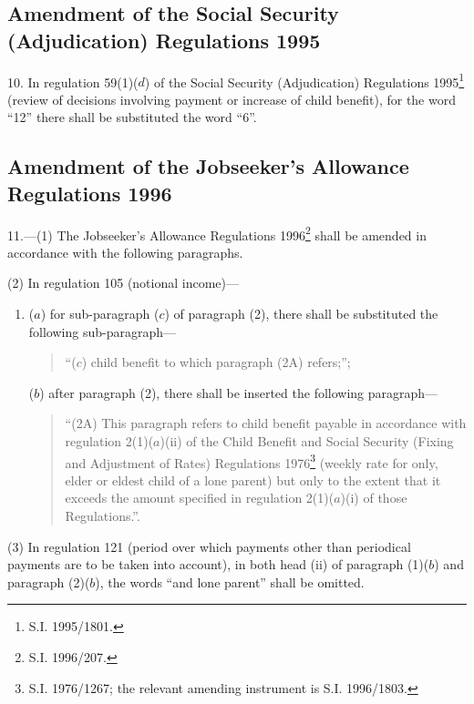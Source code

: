\documentclass[a4paper]{article}
\newcommand\fnote[1]{\footnote{\frenchspacing #1}}
\begin{document}
\subsection[10. Amendment of the Social Security (Adjudication) Regulations 1995]{Amendment of the Social Security (Adjudication) Regulations 1995}

10.  In regulation 59(1)($d$) of the Social Security (Adjudication) Regulations 1995\fnote{S.I. 1995/1801.} (review of decisions involving payment or increase of child benefit), for the word “12” there shall be substituted the word “6”.

\subsection[11. Amendment of the Jobseeker’s Allowance Regulations 1996]{Amendment of the Jobseeker’s Allowance Regulations 1996}

11.---(1) The Jobseeker’s Allowance Regulations 1996\fnote{S.I. 1996/207.} shall be amended in accordance with the following paragraphs.

(2) In regulation 105 (notional income)—
\begin{enumerate}\item[]
($a$) for sub-paragraph ($c$) of paragraph (2), there shall be substituted the following sub-paragraph—
\begin{quotation}
“($c$) child benefit to which paragraph (2A) refers;”;
\end{quotation}

($b$) after paragraph (2), there shall be inserted the following paragraph—
\begin{quotation}
“(2A) This paragraph refers to child benefit payable in accordance with regulation 2(1)($a$)(ii) of the Child Benefit and Social Security (Fixing and Adjustment of Rates) Regulations 1976\footnote{\frenchspacing S.I. 1976/1267; the relevant amending instrument is S.I. 1996/1803.} (weekly rate for only, elder or eldest child of a lone parent) but only to the extent that it exceeds the amount specified in regulation 2(1)($a$)(i) of those Regulations.”.
\end{quotation}
\end{enumerate}

(3)  In regulation 121 (period over which payments other than periodical payments are to be taken into account), in both head (ii) of paragraph (1)($b$) and paragraph (2)($b$), the words “and lone parent” shall be omitted.
\end{document}
